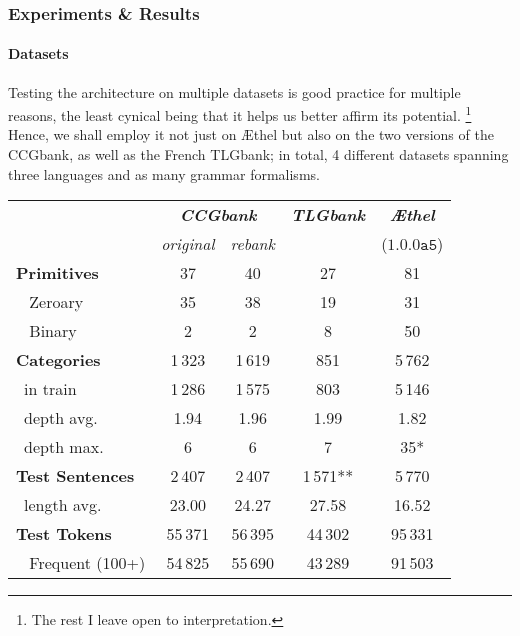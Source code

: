 \subsubsection{Experiments \& Results}
\paragraph{Datasets}
Testing the architecture on multiple datasets is good practice for multiple reasons, the least cynical being that it helps us better affirm its potential.%
	\footnote{The rest I leave open to interpretation.}
Hence, we shall employ it not just on \AE thel but also on the two versions of the CCGbank, as well as the French TLGbank; in total, 4 different datasets spanning three languages and as many grammar formalisms.

\begin{table}
    \centering
    \small{
    \begin{tabular}{@{}l@{\qquad}c@{\quad}c@{\qquad}c@{\qquad}c@{}}
        & \multicolumn{2}{c}{\textbf{\textit{CCGbank}}} 
        & \textbf{\textit{TLGbank}}
        & \textbf{\textit{\AE thel}}\\ 
        & \textit{original} & \textit{rebank} & & ($\mathtt{1.0.0a5}$)\\
        \toprule
        \textbf{Primitives}     & 37        & 40        & 27        & 81\\
        ~ Zeroary           & 35        & 38        & 19        & 31\\ 
        ~ Binary            & 2         & 2         & 8         & 50\\
        \midrule
        \textbf{Categories}     & 1\,323      & 1\,619      & 851      & 5\,762\\
        ~{in train}         & 1\,286      & 1\,575      & 803      & 5\,146\\
        ~{depth avg.}       & 1.94      & 1.96      & 1.99     &   1.82\\
        ~{depth max.}       & 6         & 6         & 7        & 35*\\ 
        \midrule
        \textbf{Test Sentences} & 2\,407      & 2\,407      & 1\,571**    & 5\,770 \\
        ~{length avg.}      & 23.00     & 24.27     & 27.58    &  16.52\\
        \midrule
        \textbf{Test Tokens}    & 55\,371     & 56\,395     & 44\,302     & 95\,331\\
        ~ Frequent {(100+)}   & 54\,825     & 55\,690     & 43\,289     & 91\,503\\

\end{tabular}}
\end{table}
